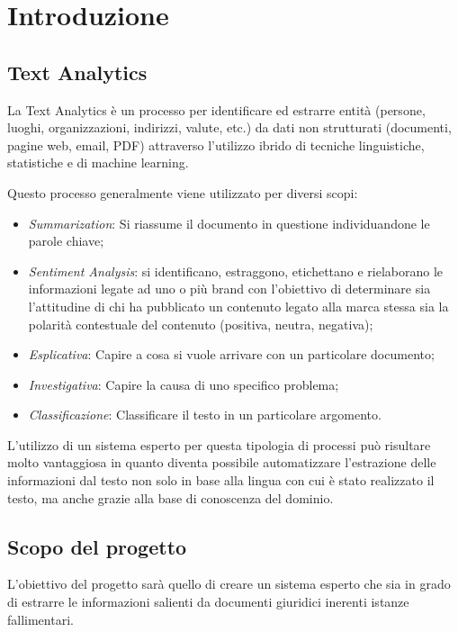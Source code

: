 
\section{Introduzione}

\subsection{Text Analytics}
\nocite{wiki:textMining}
\nocite{gartner:textAnalytics}
\nocite{expertsystem:textAnalytics}
La Text Analytics è un processo per identificare ed estrarre entità (persone, luoghi, organizzazioni, indirizzi, valute, etc.) da dati non strutturati (documenti, pagine web, email, PDF) attraverso l'utilizzo ibrido di tecniche linguistiche, statistiche e di machine learning. 

Questo processo generalmente viene utilizzato per diversi scopi:
\begin{itemize}
	\item \emph{Summarization}: Si riassume il documento in questione individuandone le parole chiave;
	\item \emph{Sentiment Analysis}: si identificano, estraggono, etichettano e rielaborano le informazioni legate ad uno o più brand con l'obiettivo di determinare sia l'attitudine di chi ha pubblicato un contenuto legato alla marca stessa sia la polarità contestuale del contenuto (positiva, neutra, negativa);
	\item \emph{Esplicativa}: Capire a cosa si vuole arrivare con un particolare documento;
	\item \emph{Investigativa}: Capire la causa di uno specifico problema;
	\item \emph{Classificazione}: Classificare il testo in un particolare argomento.
\end{itemize}

L'utilizzo di un sistema esperto per questa tipologia di processi può risultare molto vantaggiosa in quanto diventa possibile automatizzare l'estrazione delle informazioni dal testo non solo in base alla lingua con cui è stato realizzato il testo, ma anche grazie alla base di conoscenza del dominio.

\subsection{Scopo del progetto}
\label{scopo}
L'obiettivo del progetto sarà quello di creare un sistema esperto che sia in grado di estrarre le informazioni salienti da documenti giuridici inerenti istanze fallimentari.